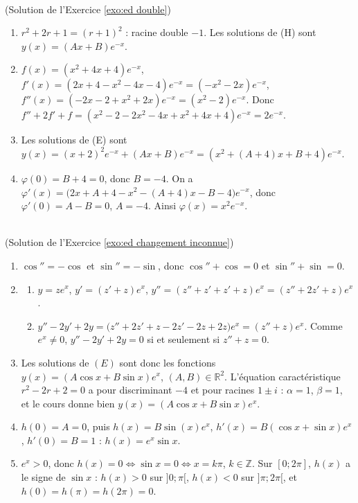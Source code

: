 \begin{corrige}
\begin{sol} ~ \\
(Solution de l'Exercice \ref{exo:ed double})
\begin{enumerate}
\item $r^2 + 2r + 1 = (r+1)^2$ : racine double $-1$. Les solutions de (H) sont $y(x) = (Ax + B) e^{-x}$.
\item $f(x) = (x^2 + 4x + 4) e^{-x}$, $f'(x) = (2x + 4 - x^2 - 4x - 4)e^{-x} = (-x^2 - 2x) e^{-x}$,
      $f''(x) = (-2x - 2 + x^2 + 2x) e^{-x} = (x^2 - 2) e^{-x}$. Donc
      $f'' + 2f' + f = (x^2 - 2 - 2x^2 - 4x + x^2 + 4x + 4) e^{-x} = 2 e^{-x}$.
\item Les solutions de (E) sont $y(x) = (x+2)^2 e^{-x} + (Ax + B) e^{-x} = (x^2 + (A+4)x + B + 4) e^{-x}$.
\item $\varphi(0) = B + 4 = 0$, donc $B = -4$. On a $\varphi'(x) = \big(2x + A + 4 - x^2 - (A+4)x - B - 4\big)e^{-x}$,
      donc $\varphi'(0) = A - B = 0$, $A = -4$. Ainsi $\boxed{\varphi(x) = x^2 e^{-x}}$.
\end{enumerate}
\end{sol}

\begin{sol} ~ \\
(Solution de l'Exercice \ref{exo:ed changement inconnue})
\begin{enumerate}
\item $\cos'' = -\cos$ et $\sin'' = -\sin$, donc $\cos'' + \cos = 0$ et $\sin'' + \sin = 0$.
\item \begin{enumerate}
      \item $y = z e^{x}$, $y' = (z' + z) e^{x}$, $y'' = (z'' + z' + z' + z) e^{x} = (z'' + 2z' + z) e^{x}$.
      \item $y'' - 2y' + 2y = \big(z'' + 2z' + z - 2z' - 2z + 2z\big) e^{x} = (z'' + z) e^{x}$.
            Comme $e^{x} \neq 0$, $y'' - 2y' + 2y = 0$ si et seulement si $z'' + z = 0$.
      \end{enumerate}
\item Les solutions de $(E)$ sont donc les fonctions $y(x) = (A\cos x + B \sin x) e^{x}$, $(A , B) \in \mathbb{R}^2$.
      L'\'equation caract\'eristique $r^2 - 2r + 2 = 0$ a pour discriminant $-4$ et pour racines $1 \pm i$ :
      $\alpha = 1$, $\beta = 1$, et le cours donne bien $y(x) = (A \cos x + B \sin x) e^{x}$.
\item $h(0) = A = 0$, puis $h(x) = B \sin(x) e^{x}$, $h'(x) = B(\cos x + \sin x) e^{x}$, $h'(0) = B = 1$ :
      $\boxed{h(x) = e^{x} \sin x}$.
\item $e^{x} > 0$, donc $h(x) = 0 \iff \sin x = 0 \iff x = k\pi$, $k \in \mathbb{Z}$.
      Sur $[0 ; 2\pi]$, $h(x)$ a le signe de $\sin x$ : $h(x) > 0$ sur $]0 ; \pi[$, $h(x) < 0$ sur $]\pi ; 2\pi[$,
      et $h(0) = h(\pi) = h(2\pi) = 0$.
\end{enumerate}
\end{sol}


\end{corrige}
